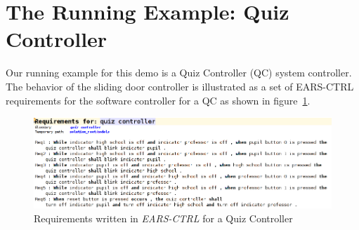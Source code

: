 \vspace{-.5cm}
\section{The Running Example: Quiz Controller}
\label{sec:example}
\vspace{-.3cm}
Our running example for this demo is a Quiz Controller (QC) system
controller. The behavior of the sliding door controller is illustrated as a set
of \textsf{EARS-CTRL} requirements for the software controller for a QC as shown in
figure~\ref{fig:QC_reqs}.
\begin{figure}[!h]
\centering
\includegraphics[width=1\textwidth]{./images/QC_Reqs.png}
\caption{Requirements written in \emph{EARS-CTRL} for a Quiz Controller}
\label{fig:QC_reqs}
\end{figure}
